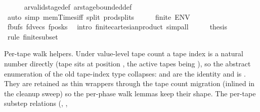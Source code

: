 \begin{isabellebody}
\ \ \ \ \isamarkupfalse%
\ ar{\isacharunderscore}{\kern0pt}valid{\isacharunderscore}{\kern0pt}stage{\isacharunderscore}{\kern0pt}def\ ar{\isacharunderscore}{\kern0pt}stage{\isacharunderscore}{\kern0pt}bounded{\isacharunderscore}{\kern0pt}def\isanewline
\ \ \ \ \isamarkupfalse%
\ {\isacharparenleft}{\kern0pt}auto\ simp{\isacharcolon}{\kern0pt}\ mem{\isacharunderscore}{\kern0pt}Times{\isacharunderscore}{\kern0pt}iff\ split{\isacharcolon}{\kern0pt}\ prod{\isachardot}{\kern0pt}splits{\isacharparenright}{\kern0pt}\isanewline
\ \ \isamarkupfalse%
\ \isamarkupfalse%
\ {\isachardoublequoteopen}finite\ {\isacharquery}{\kern0pt}ENV{\isachardoublequoteclose}\isanewline
\ \ \ \ \isamarkupfalse%
\ fbufs\ fdvecs\ fposks\ \isamarkupfalse%
\ {\isacharparenleft}{\kern0pt}intro\ finite{\isacharunderscore}{\kern0pt}cartesian{\isacharunderscore}{\kern0pt}product{\isacharparenright}{\kern0pt}\ simp{\isacharunderscore}{\kern0pt}all\isanewline
\ \ \isamarkupfalse%
\ \isamarkupfalse%
\ {\isacharquery}{\kern0pt}thesis\ \isamarkupfalse%
\ {\isacharparenleft}{\kern0pt}rule\ finite{\isacharunderscore}{\kern0pt}subset{\isacharparenright}{\kern0pt}\isanewline
{}\isamarkupfalse%
%
\endisatagproof
{\isafoldproof}%
%
\isadelimproof
%
\endisadelimproof
%
\isadelimdocument
%
\endisadelimdocument
%
\isatagdocument
%
\isamarkuptrue%
%
\endisatagdocument
{\isafolddocument}%
%
\isadelimdocument
%
\endisadelimdocument
%
\begin{isamarkuptext}%
Per-tape walk helpers.  Under value-level tape count a tape index
  is a natural number directly (tape  sits at position
  , the active tapes being ), so the abstract
  enumeration of the old  tape-index type collapses: 
  and  are the identity and  is .
  They are retained as thin wrappers through the tape count migration (inlined
  in the cleanup sweep) so the per-phase walk lemmas keep their shape.  The
  per-tape substep relations (, ,

\end{isamarkuptext}
\end{isabellebody}

